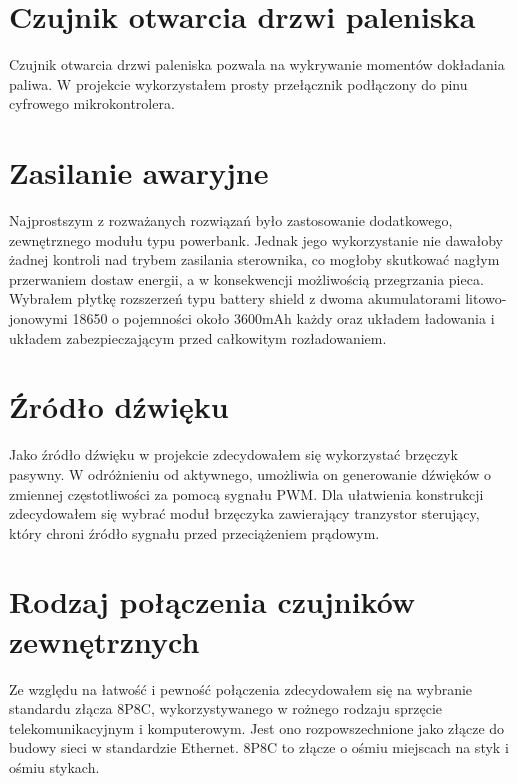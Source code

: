 \documentclass[11pt]{report}
\begin{document}
 \section{Czujnik otwarcia drzwi paleniska}
 Czujnik otwarcia drzwi paleniska pozwala na wykrywanie momentów dokładania paliwa. W projekcie wykorzystałem prosty przełącznik podłączony do pinu cyfrowego mikrokontrolera.
 
 \section{Zasilanie awaryjne}
 Najprostszym z rozważanych rozwiązań było zastosowanie dodatkowego, zewnętrznego modułu typu powerbank. Jednak jego wykorzystanie nie dawałoby żadnej kontroli nad trybem zasilania sterownika, co mogłoby skutkować nagłym przerwaniem dostaw energii, a w konsekwencji możliwością przegrzania pieca. Wybrałem płytkę rozszerzeń typu battery shield z dwoma akumulatorami litowo-jonowymi 18650 o pojemności około 3600mAh każdy oraz układem ładowania i układem zabezpieczającym przed całkowitym rozładowaniem.
 
 \section{Źródło dźwięku}
 Jako źródło dźwięku w projekcie zdecydowałem się wykorzystać brzęczyk pasywny. W odróżnieniu od aktywnego, umożliwia on generowanie dźwięków o zmiennej częstotliwości za pomocą sygnału PWM. Dla ułatwienia konstrukcji zdecydowałem się wybrać moduł brzęczyka zawierający tranzystor sterujący, który chroni źródło sygnału przed przeciążeniem prądowym.
 
 \section{Rodzaj połączenia czujników zewnętrznych}
 Ze względu na łatwość i pewność połączenia zdecydowałem się na wybranie standardu złącza 8P8C, wykorzystywanego w rożnego rodzaju sprzęcie telekomunikacyjnym i komputerowym. Jest ono rozpowszechnione jako złącze do budowy sieci w standardzie Ethernet. 8P8C to złącze o ośmiu miejscach na styk i ośmiu stykach.
 
 
\end{document}
